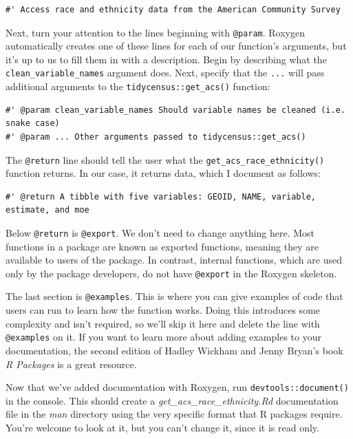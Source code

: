 \documentclass[
]{book}
\begin{document}
\begin{verbatim}
#' Access race and ethnicity data from the American Community Survey
\end{verbatim}

Next, turn your attention to the lines beginning with \texttt{@param}. Roxygen automatically creates one of these lines for each of our function's arguments, but it's up to us to fill them in with a description. Begin by describing what the \texttt{clean\_variable\_names} argument does. Next, specify that the \texttt{...} will pass additional arguments to the \texttt{tidycensus::get\_acs()} function:

\begin{verbatim}
#' @param clean_variable_names Should variable names be cleaned (i.e. snake case)
#' @param ... Other arguments passed to tidycensus::get_acs()
\end{verbatim}

The \texttt{@return} line should tell the user what the \texttt{get\_acs\_race\_ethnicity()} function returns. In our case, it returns data, which I document as follows:

\begin{verbatim}
#' @return A tibble with five variables: GEOID, NAME, variable, estimate, and moe
\end{verbatim}

Below \texttt{@return} is \texttt{@export}. We don't need to change anything here. Most functions in a package are known as exported functions, meaning they are available to users of the package. In contrast, internal functions, which are used only by the package developers, do not have \texttt{@export} in the Roxygen skeleton.

The last section is \texttt{@examples}. This is where you can give examples of code that users can run to learn how the function works. Doing this introduces some complexity and isn't required, so we'll skip it here and delete the line with \texttt{@examples} on it. If you want to learn more about adding examples to your documentation, the second edition of Hadley Wickham and Jenny Bryan's book \emph{R Packages} is a great resource.

Now that we've added documentation with Roxygen, run \texttt{devtools::document()} in the console. This should create a \emph{get\_acs\_race\_ethnicity.Rd} documentation file in the \emph{man} directory using the very specific format that R packages require. You're welcome to look at it, but you can't change it, since it is read only.
\end{document}
